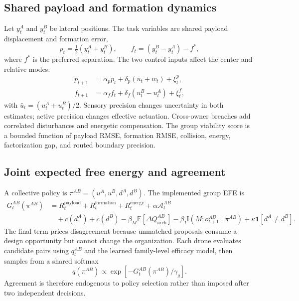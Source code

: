 \documentclass[11pt,a4paper]{article}
\numberwithin{equation}{section}
\newcommand{\MI}{\mathrm{I}}
\newcommand{\E}{\mathbb{E}}
\begin{document}
\subsection{Shared payload and formation dynamics}

Let $y_t^A$ and $y_t^B$ be lateral positions. The task variables are shared
payload displacement and formation error,
\begin{equation}
 p_t=\tfrac12(y_t^A+y_t^B),\qquad
 f_t=(y_t^B-y_t^A)-f^*,
 \label{eq:payload-formation}
\end{equation}
where $f^*$ is the preferred separation. The two control inputs affect the
center and relative modes:
\begin{align}
 p_{t+1}&=\alpha_p p_t+\delta_p(\bar u_t+w_t)+\xi_t^p,\\
 f_{t+1}&=\alpha_f f_t+\delta_f(u_t^B-u_t^A)+\xi_t^f,
 \label{eq:collective-dynamics}
\end{align}
with $\bar u_t=(u_t^A+u_t^B)/2$. Sensory precision changes uncertainty in
both estimates; active precision changes effective actuation. Cross-owner
breaches add correlated disturbances and energetic compensation. The group
viability score is a bounded function of payload RMSE, formation RMSE,
collision, energy, factorization gap, and routed boundary precision.

\subsection{Joint expected free energy and agreement}

A collective policy is
$\pi^{AB}=(u^A,u^B,d^A,d^B)$. The implemented group EFE is
\begin{align}
 G_t^{AB}(\pi^{AB})
 &=R_t^{\mathrm{payload}}+R_t^{\mathrm{formation}}
   +R_t^{\mathrm{energy}}+\alpha\mathcal A_t^{AB}\\
 &\quad+c(d^A)+c(d^B)
 -\beta_M\E[\Delta Q_{\mathrm{arch}}^{AB}]
 -\beta_I\MI(M;o_{t+1}^{AB}\mid\pi^{AB})
 +\kappa\mathbf1[d^A\neq d^B].
 \label{eq:collective-efe}
\end{align}
The final term prices disagreement because unmatched proposals consume a
design opportunity but cannot change the organization. Each drone evaluates
candidate pairs using $q_t^{AB}$ and the learned family-level efficacy model,
then samples from a shared softmax
\begin{equation}
 q(\pi^{AB})\propto\exp[-G_t^{AB}(\pi^{AB})/\gamma_g].
 \label{eq:group-policy}
\end{equation}
Agreement is therefore endogenous to policy selection rather than imposed
after two independent decisions.
\end{document}
